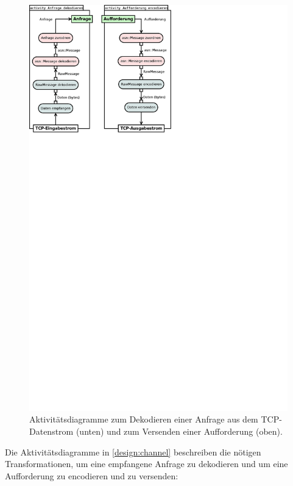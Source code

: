 \begin{figure}[h]
	\centering
	\includegraphics[width=1.4\textwidth]{dia/channel_sep}
	\caption{Aktivitätsdiagramme zum Dekodieren einer Anfrage aus dem TCP-Datenstrom (unten) und zum Versenden einer Aufforderung (oben).}
	\label{design:channel}
\end{figure}

Die Aktivitätsdiagramme in \autoref{design:channel} beschreiben die nötigen Transformationen, um eine empfangene Anfrage zu dekodieren und um eine Aufforderung zu encodieren und zu versenden:

